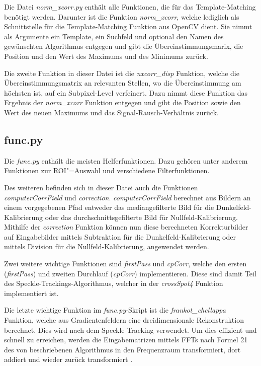 Die Datei \textit{norm\_xcorr.py} enthält alle Funktionen, die für das Template-Matching benötigt werden. Darunter ist die Funktion \textit{norm\_xcorr}, welche lediglich als Schnittstelle für die Template-Matching Funktion aus OpenCV dient. Sie nimmt als Argumente ein Template, ein Suchfeld und optional den Namen des gewünschten Algorithmus entgegen und gibt die Übereinstimmungsmarix, die Position und den Wert des Maximums und des Minimums zurück.

Die zweite Funktion in dieser Datei ist die \textit{nxcorr\_disp} Funktion, welche die Übereinstimmungsmatrix an relevanten Stellen, wo die Übereinstimmung am höchsten ist, auf ein Subpixel-Level verfeinert. Dazu nimmt diese Funktion das Ergebnis der \textit{norm\_xcorr} Funktion entgegen und gibt die Position sowie den Wert des neuen Maximums und das Signal-Rausch-Verhältnis zurück. 

\subsection{func.py}

Die \textit{func.py} enthält die meisten Helferfunktionen. Dazu gehören unter anderem Funktionen zur \gls{ROI}"=Auswahl und verschiedene Filterfunktionen. 

Des weiteren befinden sich in dieser Datei auch die Funktionen \textit{computerCorrField} und \textit{correction}. \textit{computerCorrField} berechnet aus Bildern an einem vorgegebenen Pfad entweder das mediangefilterte Bild für die Dunkelfeld-Kalibrierung oder das durchschnittsgefilterte Bild für Nullfeld-Kalibrierung. Mithilfe der \textit{correction} Funktion können nun diese berechneten Korrekturbilder auf Eingabebilder mittels Subtraktion für die Dunkelfeld-Kalibrierung oder mittels Division für die Nullfeld-Kalibrierung, angewendet werden.

Zwei weitere wichtige Funktionen sind \textit{firstPass} und \textit{cpCorr}, welche den ersten (\textit{firstPass}) und zweiten Durchlauf (\textit{cpCorr}) implementieren. Diese sind damit Teil des Speckle-Trackings-Algorithmus, welcher in der \textit{crossSpot4} Funktion implementiert ist.

Die letzte wichtige Funktion im \textit{func.py}-Skript ist die \textit{frankot\_chellappa} Funktion, welche aus Gradientenfeldern eine dreidimensionale Rekonstruktion berechnet. Dies wird nach dem Speckle-Tracking verwendet. Um dies effizient und schnell zu erreichen, werden die Eingabematrizen mittels \glspl{FFT} nach Formel 21 des von \citeauthor{FC88} beschriebenen Algorithmus in den Frequenzraum transformiert, dort addiert und wieder zurück transformiert . 

